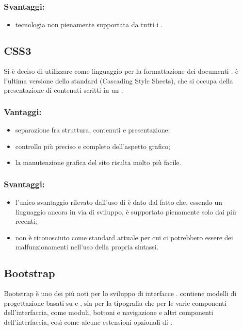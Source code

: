 \documentclass[a4paper, titlepage]{article}
\begin{document}
\subsubsection{Svantaggi:}

\begin{itemize}
	\item tecnologia non pienamente supportata da tutti i .
\end{itemize}

\subsection{CSS3}
Si è deciso di utilizzare  come linguaggio per la formattazione dei documenti .  è l'ultima versione dello standard  (Cascading Style Sheets), che si occupa della presentazione di contenuti scritti in un .

\subsubsection{Vantaggi:}

\begin{itemize}
	\item separazione fra struttura, contenuti e presentazione;
	\item controllo più preciso e completo dell'aspetto grafico;
	\item la manutenzione grafica del sito risulta molto più facile.
\end{itemize}

\subsubsection{Svantaggi:}

\begin{itemize}
	\item l’unico svantaggio rilevato dall’uso di  è dato dal fatto che, essendo un linguaggio ancora in via di sviluppo, è supportato pienamente solo dai   più recenti;
	\item non è riconosciuto come standard attuale per cui ci potrebbero essere dei malfunzionamenti nell'uso della propria sintassi. 
\end{itemize}

\subsection{Bootstrap}
Bootstrap è uno dei più noti  per lo sviluppo di interfacce .  contiene modelli di progettazione basati su  e , sia per la tipografia che per le varie componenti dell'interfaccia, come moduli, bottoni e navigazione e altri componenti dell'interfaccia, così come alcune estensioni opzionali di .
\end{document}
